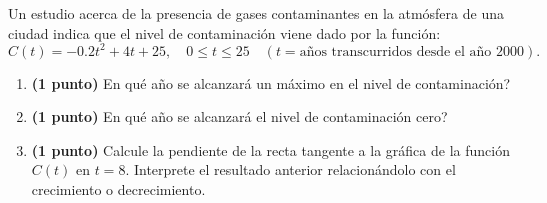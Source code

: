 
Un estudio acerca de la presencia de gases contaminantes en la atmósfera de una ciudad indica que el nivel de contaminación viene dado por la función:
\[
C(t)=-0.2t^2+4t+25,\quad0\leq t\leq25\quad(t=\text{años transcurridos desde el año 2000}).
\]
\begin{enumerate}[label=\alph*)]
\item \textbf{(1 punto)} \textquestiondown{}En qué año se alcanzará un máximo en el nivel de contaminación?
\item \textbf{(1 punto)} \textquestiondown{}En qué año se alcanzará el nivel de contaminación cero?
\item \textbf{(1 punto)} Calcule la pendiente de la recta tangente a la gráfica de la función $C(t)$ en $t=8$. Interprete el resultado anterior relacionándolo con el crecimiento o decrecimiento.
\end{enumerate}
